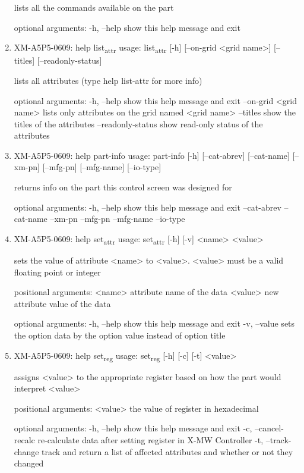\documentclass[11pt]{article}
\begin{document}
\begin{enumerate}
lists all the commands available on the part

optional arguments:
  -h, --help  show this help message and exit

\item XM-A5P5-0609: help list\textsubscript{attr}
\label{sec:org106b41a}
usage: list\textsubscript{attr} [-h] [--on-grid <grid name>] [--titles] [--readonly-status]

lists all attributes (type help list-attr for more info)

optional arguments:
  -h, --help            show this help message and exit
  --on-grid <grid name>
                        lists only attributes on the grid named <grid name>
  --titles              show the titles of the attributes
  --readonly-status     show read-only status of the attributes

\item XM-A5P5-0609: help part-info
\label{sec:orgb1a4b7a}
usage: part-info  [-h] [--cat-abrev] [--cat-name] [--xm-pn] [--mfg-pn] [--mfg-name]
        [--io-type]

returns info on the part this control screen was designed for

optional arguments:
  -h, --help   show this help message and exit
  --cat-abrev
  --cat-name
  --xm-pn
  --mfg-pn
  --mfg-name
  --io-type

\item XM-A5P5-0609: help set\textsubscript{attr}
\label{sec:org6a0e816}
usage: set\textsubscript{attr} [-h] [-v] <name> <value>

sets the value of attribute <name> to <value>. <value> must be a valid
floating point or integer

positional arguments:
  <name>       attribute name of the data
  <value>      new attribute value of the data

optional arguments:
  -h, --help   show this help message and exit
  -v, --value  sets the option data by the option value instead of option
               title

\item XM-A5P5-0609: help set\textsubscript{reg}
\label{sec:orgde31ede}
usage: set\textsubscript{reg} [-h] [-c] [-t] <value>

assigns <value> to the appropriate register based on how the part would
interpret <value>

positional arguments:
  <value>              the value of register in hexadecimal

optional arguments:
  -h, --help           show this help message and exit
  -c, --cancel-recalc  re-calculate data after setting register in X-MW
                       Controller
  -t, --track-change   track and return a list of affected attributes and
                       whether or not they changed


\end{enumerate}
\end{document}
